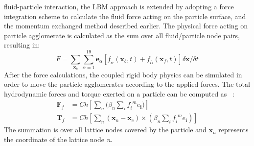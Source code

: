 fluid-particle interaction, the LBM approach is extended by adopting a force 
integration scheme to calculate the fluid force acting on the particle surface, 
and the momentum exchanged method described earlier. The physical force acting 
on particle agglomerate is calculated as the sum over all fluid/particle node 
pairs, resulting in: 
%
\begin{equation}
\mathit{F} = 
\sum\limits_{\mathbf{x}_{b}}\sum\limits_{\alpha=1}^{19}{\mathbf{e}_{\alpha}[\mathit{f}_{\alpha}(\mathbf{x}_{b},t)+\mathit{f}_{\overline{\alpha}}(\mathbf{x}_{f},t)]
 \delta \mathbf{x} / \delta t}
\end{equation}
%
After the force calculations, the coupled rigid body physics can be simulated 
in order to move the particle agglomerates according to the applied forces. The 
total hydrodynamic forces and torque exerted on a particle can be computed as 
~\citep{Cook2004, Noble1998}:
%
\begin{align}
\mathbf{F}_{f} & = \mathit{Ch}[\sum\limits_{\mathit{n}}{(\beta_{\mathit{n}} 
\sum\limits_{\mathit{i}}{\mathit{f_i}^{\mathit{ m}}\mathbf{\mathit{e}_i}}})] \\ 
\mathbf{T}_{f} & = 
\mathit{Ch}[\sum\limits_{\mathit{n}}{(\mathbf{x}_{\mathit{n}}-\mathbf{x}_{\mathit{c}})
 \times (\beta_{\mathit{n}} \sum\limits_{\mathit{i}}{\mathit{f_i}^{\mathit{ 
m}}\mathbf{\mathit{e}_i}})}]
\end{align}
%
The summation is over all lattice nodes covered by the particle and 
$\mathbf{x}_{\mathit{n}}$ represents the coordinate of the lattice node 
\textit{n}.
%
